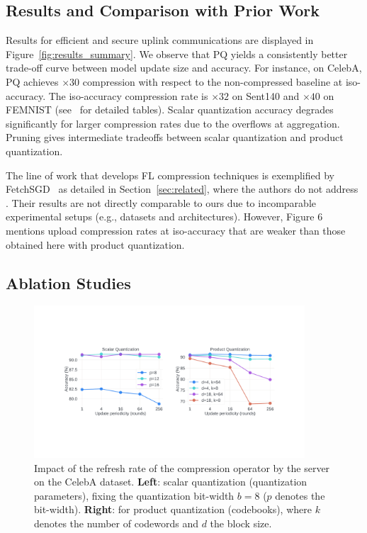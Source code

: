 \subsection{Results and Comparison with Prior Work}

Results for efficient and secure uplink communications are displayed in Figure~\ref{fig:results_summary}.
We observe that PQ yields a consistently better trade-off curve between model update size and accuracy. For instance, on CelebA, PQ achieves $\times 30$ compression with respect to the non-compressed baseline at iso-accuracy. The iso-accuracy compression rate is $\times 32$ on Sent140 and $\times 40$ on FEMNIST (see~\cite{techreport} for detailed tables).
Scalar quantization accuracy degrades significantly for larger compression rates due to the overflows at aggregation.
Pruning gives intermediate tradeoffs between scalar quantization and product quantization.

The line of work that develops FL compression techniques is exemplified by FetchSGD~\cite{rothchild2020fetchsgd} as detailed in Section~\ref{sec:related}, where the authors do not address \SecAgg.
Their results are not directly comparable to ours due to incomparable experimental setups (e.g., datasets and architectures).
However, Figure 6~\cite{techreport} mentions upload compression rates at iso-accuracy that are weaker than those obtained here with product quantization.

\subsection{Ablation Studies}
\label{subsec:ablations}

\begin{figure}[t]
    \label{mask-refresh}
    \centering
    \includegraphics[width=0.9\textwidth]{submissions/GrahamCormode/figs/refresh.pdf}
    \caption{\label{fig:refresh}
    Impact of the refresh rate of the compression operator by the server on the CelebA dataset. \textbf{Left}:  scalar quantization (quantization parameters), fixing the quantization bit-width $b=8$ ($p$ denotes the \SecAgg bit-width). \textbf{Right}: for product quantization (codebooks), where $k$ denotes the number of codewords and $d$ the block size.}
    \vspace{-3mm}
\end{figure}



